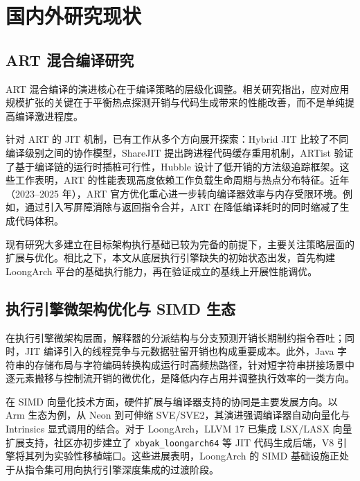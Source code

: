 \section{国内外研究现状}

\subsection{ART 混合编译研究}

ART 混合编译的演进核心在于编译策略的层级化调整。相关研究指出，应对应用规模扩张的关键在于平衡热点探测开销与代码生成带来的性能改善，而不是单纯提高编译激进程度\citep{Paleczny2001, Suganuma2001, Kotzmann2008}。

针对 ART 的 JIT 机制，已有工作从多个方向展开探索：Hybrid JIT 比较了不同编译级别之间的协作模型，ShareJIT 提出跨进程代码缓存重用机制，ARTist 验证了基于编译链的运行时插桩可行性，Hubble 设计了低开销的方法级追踪框架\citep{Perez2012HybridJIT, Xu2018ShareJIT, Backes2017ARTist, Luo2022Hubble}。这些工作表明，ART 的性能表现高度依赖工作负载生命周期与热点分布特征。近年（2023--2025 年），ART 官方优化重心进一步转向编译器效率与内存受限环境。例如，通过引入写屏障消除与返回指令合并，ART 在降低编译耗时的同时缩减了生成代码体积\citep{GoogleART2023, GoogleART2025}。

现有研究大多建立在目标架构执行基础已较为完备的前提下，主要关注策略层面的扩展与优化。相比之下，本文从底层执行引擎缺失的初始状态出发，首先构建 LoongArch 平台的基础执行能力，再在验证成立的基线上开展性能调优。

\subsection{执行引擎微架构优化与 SIMD 生态}

在执行引擎微架构层面，解释器的分派结构与分支预测开销长期制约指令吞吐\citep{Ertl2003}；同时，JIT 编译引入的线程竞争与元数据驻留开销也构成重要成本\citep{Arnold2005, Fink2003, Lameed2013}。此外，Java 字符串的存储布局与字符编码转换构成运行时高频热路径，针对短字符串拼接场景中逐元素搬移与控制流开销的微优化，是降低内存占用并调整执行效率的一类方向\citep{Haubl2008OptimizedStrings, Haubl2010CompactStrings}。

在 SIMD 向量化技术方面，硬件扩展与编译器支持的协同是主要发展方向。以 Arm 生态为例，从 Neon 到可伸缩 SVE/SVE2，其演进强调编译器自动向量化与 Intrinsics 显式调用的结合\citep{ARMSIMD2023, ARMCompiler2024}。对于 LoongArch，LLVM 17 已集成 LSX/LASX 向量扩展支持\citep{LoongArchLLVM2023}，社区亦初步建立了 \texttt{xbyak\_loongarch64} 等 JIT 代码生成后端\citep{XbyakLoongArch2024}，V8 引擎将其列为实验性移植端口\citep{V8LoongArch2024}。这些进展表明，LoongArch 的 SIMD 基础设施正处于从指令集可用向执行引擎深度集成的过渡阶段。

